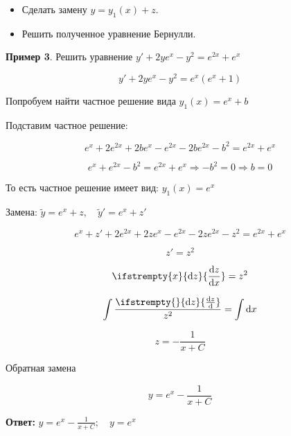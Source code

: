 \documentclass[a4paper, 14pt]{article}
\newcommand{\dx}{\mathrm{d}x}
\newcommand{\dv}[2]{%
  \ifstrempty{#2}%
    {\mathrm{d}#1}%
    {\frac{\mathrm{d}#1}{\mathrm{d}#2}}%
}
\theoremstyle{definition}
\newtheorem*{example}{Пример}
\newenvironment{answer}
  {\par\noindent\textbf{Ответ:}}
  {\par}
\begin{document}
\begin{itemize}
\begin{itemize}
Иногда частное решение можно подобрать, внимательно посмотрев на свободный член уравнения \\(не содержащий $y$)

\begin{example}
    \[y' + y^2 = x^2 - 2x(= x(x-2))\]
    
    Надо брать <<подобный>> правой части $y = ax+b$
\end{example}
\begin{example}
\[y' + 2y^2 = \frac{6}{x^2}\]

В этом случае можно сделать замену $y = \frac{a}{x}$

Производя необходимую замену, находим $a$ и $b$.
\end{example}
        \item[\scriptsize\textbullet] Сделать замену $y = y_1(x)+z$.
        \item[\scriptsize\textbullet] Решить полученное уравнение Бернулли.
\end{itemize}

\begin{example}
    Решить уравнение $y'+2ye^x-y^2= e^{2x} +e^x$

    \[y'+2ye^x-y^2= e^x(e^x + 1)\]

    Попробуем найти частное решение вида $y_1(x) = e^x +b$

    Подставим частное решение:

    \[e^x+ 2e^{2x} + 2be^x - e^{2x} - 2be^{2x}-b^2=e^{2x} +e^x\]

    \[e^x+e^{2x} - b^2 =e^{2x} +e^x \Longrightarrow -b^2 = 0 \Longrightarrow b = 0\]

    То есть частное решение имеет вид: $y_1(x) = e^x$

    Замена: $\tilde{y} = e^x + z, \quad \tilde{y}'= e^x + z'$

    \[e^x + z' + 2e^{2x} + 2ze^x - e^{2x} - 2ze^{2x}-z^2= e^{2x}+e^{x}\]

    \[z' = z^2\]

    \[\dv{z}{x} = z^2\]

    \[\int{\frac{\dv{z}{}}{z^2}} = \int{\dx}\]

    \[z = - \frac{1}{x+C}\]

    Обратная замена

    \[y = e^x - \frac{1}{x+C}\]
\end{example}
\begin{answer}
    $y = e^x - \frac{1}{x+C}; \quad y = e^x$
\end{answer}

\end{itemize}
\newpage
\end{document}
